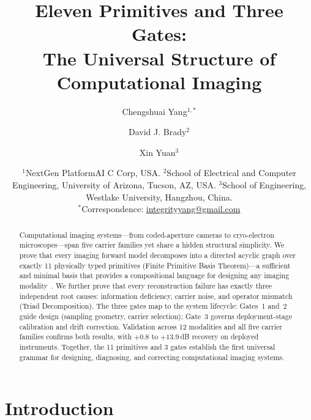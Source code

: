 \documentclass[11pt]{article}
\begin{document}
\title{Eleven Primitives and Three Gates:\\
The Universal Structure of Computational Imaging}

\author{
Chengshuai Yang$^{1,*}$
\and
David J. Brady$^{2}$
\and
Xin Yuan$^{3}$
}

\date{%
$^1$NextGen PlatformAI C Corp, USA.\quad
$^2$School of Electrical and Computer Engineering, University of Arizona, Tucson, AZ, USA.\quad
$^3$School of Engineering, Westlake University, Hangzhou, China.\\[2pt]
$^*$Correspondence: \url{integrityyang@gmail.com}%
}

\maketitle

\begin{abstract}
Computational imaging systems---from coded-aperture cameras to cryo-electron microscopes---span five carrier families yet share a hidden structural simplicity. We prove that every imaging forward model decomposes into a directed acyclic graph over exactly 11 physically typed primitives (Finite Primitive Basis Theorem)---a sufficient and minimal basis that provides a compositional language for designing any imaging modality~\cite{yang2026fpt}. We further prove that every reconstruction failure has exactly three independent root causes: information deficiency, carrier noise, and operator mismatch (Triad Decomposition). The three gates map to the system lifecycle: Gates~1 and~2 guide design (sampling geometry, carrier selection); Gate~3 governs deployment-stage calibration and drift correction. Validation across 12 modalities and all five carrier families confirms both results, with $+0.8$ to $+13.9$\,dB recovery on deployed instruments. Together, the 11 primitives and 3 gates establish the first universal grammar for designing, diagnosing, and correcting computational imaging systems.
\end{abstract}

\section*{Introduction}
\end{document}
